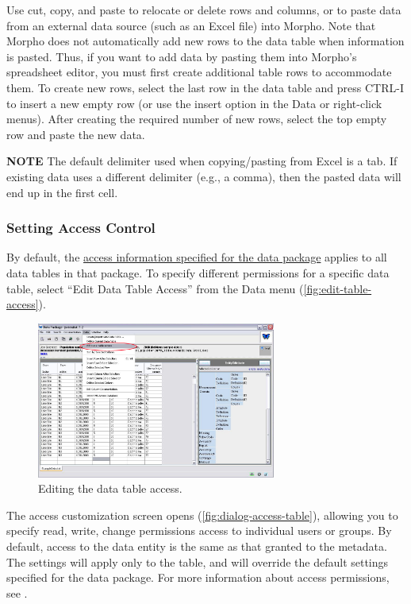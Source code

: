 Use cut, copy, and paste to relocate or delete rows and columns, or to
paste data from an external data source (such as an Excel file) into
Morpho. Note that Morpho does not automatically add new rows to the data
table when information is pasted. Thus, if you want to add data by
pasting them into Morpho's spreadsheet editor, you must first create
additional table rows to accommodate them. To create new rows, select
the last row in the data table and press CTRL-I to insert a new empty
row (or use the insert option in the Data or right-click menus). After
creating the required number of new rows, select the top empty row and
paste the new data. 

\begin{shaded}
  \textbf{NOTE} The default delimiter used when copying/pasting from
  Excel is a tab. If existing data uses a different delimiter (e.g., a
  comma), then the pasted data will end up in the first cell.
\end{shaded}

\subsubsection{Setting Access Control} \label{sec:edit-table-access}

By default, the \hyperref[sec:wizard-dp-access]{access information
specified for the data package} applies to all data tables in that
package. To specify different permissions for a specific data table,
select ``Edit Data Table Access'' from the Data menu
(\autoref{fig:edit-table-access}).

\begin{figure}
  \centering
    \includegraphics[width=0.7\textwidth]{images/edit-table-access.jpg}
  \caption{Editing the data table access.}
  \label{fig:edit-table-access}
\end{figure}

The access customization screen opens
(\autoref{fig:dialog-access-table}), allowing you to specify read,
write, change permissions access to individual users or groups. By
default, access to the data entity is the same as that granted to the
metadata. The settings will apply only to the table, and will override
the default settings specified for the data package. For more
information about access permissions, see
.

